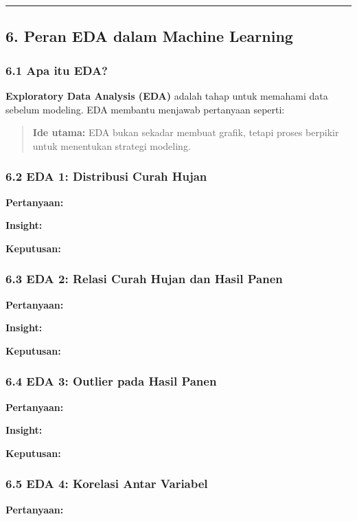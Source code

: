 \documentclass[12pt,a4paper]{article}
\begin{document}
\hrule


\subsection{6. Peran EDA dalam Machine Learning}

\subsubsection{6.1 Apa itu EDA?}

\textbf{Exploratory Data Analysis (EDA)} adalah tahap untuk memahami data sebelum modeling. EDA membantu menjawab pertanyaan seperti:



\begin{quote}
\textbf{Ide utama:} EDA bukan sekadar membuat grafik, tetapi proses berpikir untuk menentukan strategi modeling.\end{quote}


\subsubsection{6.2 EDA 1: Distribusi Curah Hujan}

\textbf{Pertanyaan:}


\textbf{Insight:}


\textbf{Keputusan:}


\subsubsection{6.3 EDA 2: Relasi Curah Hujan dan Hasil Panen}

\textbf{Pertanyaan:}


\textbf{Insight:}


\textbf{Keputusan:}


\subsubsection{6.4 EDA 3: Outlier pada Hasil Panen}

\textbf{Pertanyaan:}


\textbf{Insight:}


\textbf{Keputusan:}


\subsubsection{6.5 EDA 4: Korelasi Antar Variabel}

\textbf{Pertanyaan:}
\end{document}
